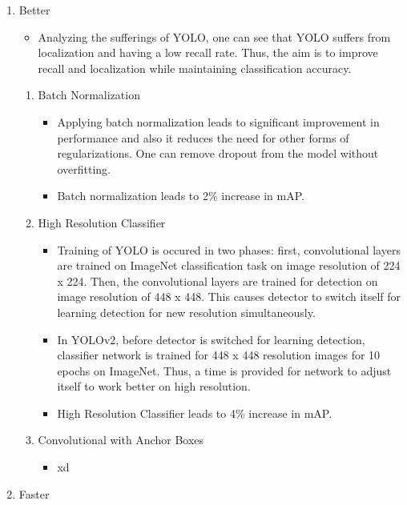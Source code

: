 \documentclass{article}
\begin{document}
\begin{enumerate}
    \item Better
    \begin{itemize}
        \item Analyzing the sufferings of YOLO, one can see that 
YOLO suffers from localization and having a low recall rate. Thus, 
the aim is to improve recall and localization while maintaining 
classification accuracy.
    \end{itemize}
    \begin{enumerate}
        \item Batch Normalization
        \begin{itemize}
            \item Applying batch normalization leads to significant 
improvement in performance and also it reduces the need for other forms 
of regularizations. One can remove dropout from the model without overfitting.
            \item Batch normalization leads to 2\% increase in mAP.
        \end{itemize}
        \item High Resolution Classifier
        \begin{itemize}
            \item Training of YOLO is occured in two phases: first, convolutional 
layers are trained on ImageNet classification task on image resolution of 224 x 224.
Then, the convolutional layers are trained for detection on image resolution of 448 x 448.
This causes detector to switch itself for learning detection for new resolution 
simultaneously.
            \item In YOLOv2, before detector is switched for learning detection, 
classifier network is trained for 448 x 448 resolution images for 10 epochs on ImageNet.
Thus, a time is provided for network to adjust itself to work better on high resolution.
            \item High Resolution Classifier leads to 4\% increase in mAP.
        \end{itemize}
        \item Convolutional with Anchor Boxes
        \begin{itemize}
            \item xd
        \end{itemize}
    \end{enumerate}
    \item Faster
\end{enumerate}
\end{document}
